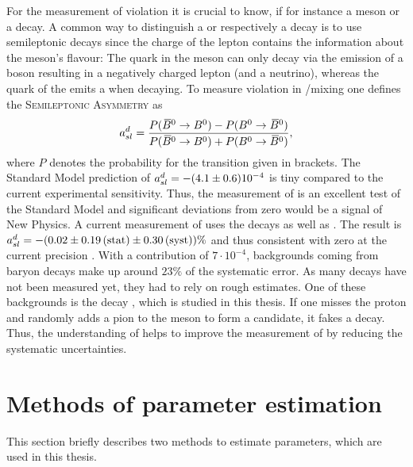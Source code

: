 For the measurement of \CP violation it is crucial to know, if for instance a \Bd meson or a \Bdb decay.
A common way to distinguish a \Bd or respectively a \Bdb decay is to use semileptonic decays since the charge of the lepton contains the information about the meson's flavour:
The \bquark quark in the \Bd meson can only decay via the emission of a \Wm boson resulting in a negatively charged lepton (and a neutrino), whereas the \bquarkbar quark of the \Bdb emits a \Wp when decaying.
To measure \CP violation in \Bd/\Bdb mixing one defines the \textsc{Semileptonic Asymmetry} \asld as
\begin{align}
    a_{sl}^d = \frac{P({{\kern 0.18em\overline{\kern -0.18em B}{}}{}^0} \rightarrow {\ensuremath{{B}^0}}) - P({{B}^0} \rightarrow {\ensuremath{{\kern 0.18em\overline{\kern -0.18em B}{}}{}^0}})}{P({{\kern 0.18em\overline{\kern -0.18em B}{}}{}^0} \rightarrow {\ensuremath{{B}^0}}) + P({{B}^0} \rightarrow {\ensuremath{{\kern 0.18em\overline{\kern -0.18em B}{}}{}^0}})},
\end{align}
where $P$ denotes the probability for the transition given in brackets.
The Standard Model prediction of $a_{sl}^d = -(4.1 \pm 0.6) 10^{-4}$ \cite{asld_SM} is tiny compared to the current experimental sensitivity.
Thus, the measurement of \asld is an excellent test of the Standard Model and significant deviations from zero would be a signal of New Physics.
A current \lhcb measurement of \asld uses the decays  as well as .
The result is $a_{sl}^d = -(0.02 \pm 0.19\mathrm{\,(stat)} \pm 0.30\mathrm{\,(syst)})\%$ and thus consistent with zero at the current precision \cite{asld_LHCb}.
With a contribution of $7\cdot 10^{-4}$, backgrounds coming from \Lb baryon decays make up around $23\%$ of the systematic error. As many \Lb decays have not been measured yet, they had to rely on rough estimates.
One of these backgrounds is the decay \LbToDpmunuX, which is studied in this thesis.
If one misses the proton and randomly adds a pion to the \Dz meson to form a \Dstar candidate, it fakes a  decay.
Thus, the understanding of \LbToDpmunuX helps to improve the measurement of \asld by reducing the systematic uncertainties.

\section{Methods of parameter estimation}
This section briefly describes two methods to estimate parameters, which are used in this thesis.

